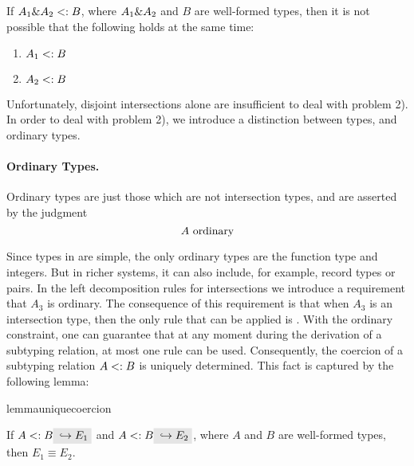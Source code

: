 \begin{lemma}
  \label{lemma:unique-subtype-contributor}

  If $A_1 \& A_2 <: B$, where $A_1 \& A_2$ and $B$ are well-formed types,
  then it is not possible that the following holds at the same time:
  \begin{enumerate}
    \item $A_1 <: B$
    \item $A_2 <: B$
  \end{enumerate}
\end{lemma}

Unfortunately, disjoint intersections alone are insufficient to deal with
problem 2). In order to deal with problem 2), we introduce a distinction between
types, and ordinary types.

\paragraph{Ordinary Types.} Ordinary types are just those which are not intersection
types, and are asserted by the judgment \[ A \ \textnormal{ordinary} \]

\noindent Since types in \name are simple, the only ordinary types are the
function type and integers.
But in richer systems, it can also include, for example, record types
or pairs.
In the left decomposition rules for intersections we introduce a requirement
that $A_3$ is ordinary. The consequence of this requirement is that when $A_3$ is
an intersection type, then the only rule that can be applied is
. With the ordinary constraint, one can guarantee that at
any moment during the derivation of a subtyping relation, at most one rule can
be used. Consequently, the coercion of a subtyping relation $A <: B$ is
uniquely determined. This fact is captured by the following lemma:

\begin{restatable}{lemma}{uniquecoercion}
  \label{lemma:unique-coercion}

  If $A \subtype B \yields {E_1}$ and $A \subtype B \yields {E_2}$, where $A$
  and $B$ are well-formed types, then $E_1 \equiv E_2$.
\end{restatable}

